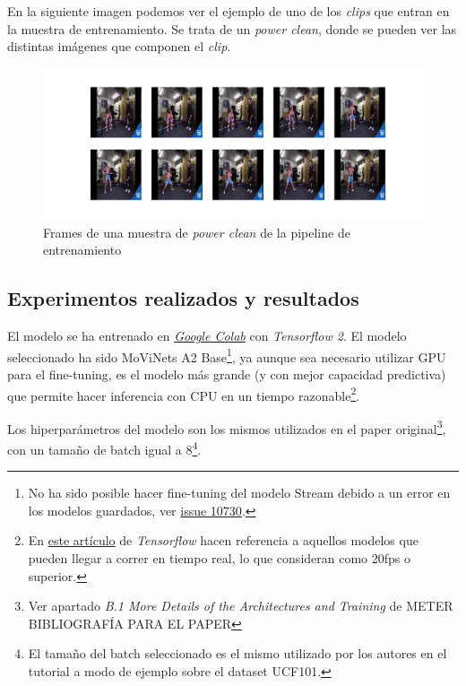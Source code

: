 En la siguiente imagen podemos ver el ejemplo de uno de los \textit{clips} que entran en la muestra de entrenamiento. Se trata de un \textit{power clean}, donde se pueden ver las distintas imágenes que componen el \textit{clip}.

\begin{figure}[H]
    \centerline{\includegraphics[width=1.25\linewidth]{figs/frames.png}}
\caption{Frames de una muestra de \textit{power clean} de la pipeline de entrenamiento}\label{frames}
\end{figure}

\subsection{Experimentos realizados y resultados}

El modelo se ha entrenado en \href{https://colab.research.google.com/?hl=es}{\textit{Google Colab}} con \textit{Tensorflow 2}. El modelo seleccionado ha sido MoViNets A2 Base\footnote{No ha sido posible hacer fine-tuning del modelo Stream debido a un error en los modelos guardados, ver \href{https://github.com/tensorflow/models/issues/10730}{issue 10730}.}, ya aunque sea necesario utilizar GPU para el fine-tuning, es el modelo más grande (y con mejor capacidad predictiva) que permite hacer inferencia con CPU en un tiempo razonable\footnote{En \href{https://blog.tensorflow.org/2022/04/video-classification-on-edge-devices.html}{este artículo} de \textit{Tensorflow} hacen referencia a aquellos modelos que pueden llegar a correr en tiempo real, lo que consideran como 20fps o superior.}.

Los hiperparámetros del modelo son los mismos utilizados en el paper original\footnote{Ver apartado \textit{B.1 More Details of the Architectures and Training} de METER BIBLIOGRAFÍA PARA EL PAPER}, con un tamaño de batch igual a 8\footnote{El tamaño del batch seleccionado es el mismo utilizado por los autores en el tutorial a modo de ejemplo sobre el dataset UCF101.}.

